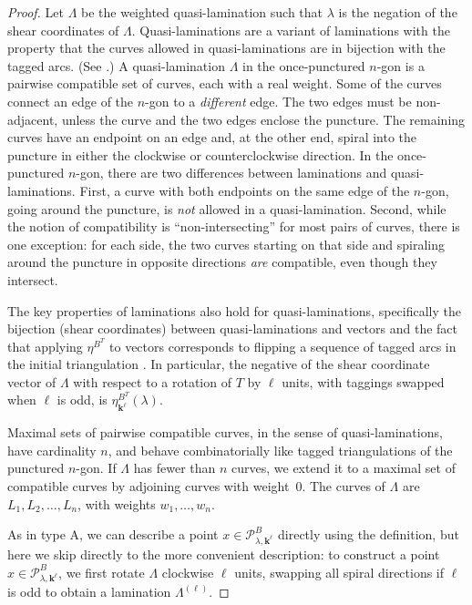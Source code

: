 \documentclass[10pt]{article}
\theoremstyle{definition}
\theoremstyle{remark}
\numberwithin{equation}{section}
\newcommand{\0}{{\mathbf{0}}}
\newcommand{\kk}{{\boldsymbol{k}}}
\renewcommand{\P}{\mathcal{P}}
\begin{document}
\begin{proof}
Let $\Lambda$ be the weighted quasi-lamination such that $\lambda$ is the negation of the shear coordinates of $\Lambda$.
Quasi-laminations are a variant of laminations with the property that the curves allowed in quasi-laminations are in bijection with the tagged arcs.
(See \cite[Section~4]{unisurface}.)
A quasi-lamination $\Lambda$ in the once-punctured $n$-gon is a pairwise compatible set of curves, each with a real weight.
Some of the curves connect an edge of the $n$-gon to a \emph{different} edge.
The two edges must be non-adjacent, unless the curve and the two edges enclose the puncture.
The remaining curves have an endpoint on an edge and, at the other end, spiral into the puncture in either the clockwise or counterclockwise direction.
In the once-punctured $n$-gon, there are two differences between laminations and quasi-laminations.
First, a curve with both endpoints on the same edge of the $n$-gon, going around the puncture, is \emph{not} allowed in a quasi-lamination.
Second, while the notion of compatibility is ``non-intersecting'' for most pairs of curves, there is one exception:  
for each side, the two curves starting on that side and spiraling around the puncture in opposite directions \emph{are} compatible, even though they intersect.

The key properties of laminations also hold for quasi-laminations, specifically the bijection (shear coordinates) between quasi-laminations and vectors \cite[Theorem~4.4]{unisurface} and the fact that applying $\eta^{B^T}$ to vectors corresponds to flipping a sequence of tagged arcs in the initial triangulation \cite[Theorem~4.3]{unisurface}.
In particular, the negative of the shear coordinate vector of $\Lambda$ with respect to a rotation of $T$ by $\ell$ units, with taggings swapped when $\ell$ is odd, is $\eta^{B^T}_{\kk^\ell}(\lambda)$.

Maximal sets of pairwise compatible curves, in the sense of quasi-laminations, have cardinality $n$, and behave combinatorially like tagged triangulations of the punctured $n$-gon.
If $\Lambda$ has fewer than $n$ curves, we extend it to a maximal set of compatible curves by adjoining curves with weight~$0$.
The curves of $\Lambda$ are $L_1,L_2,\ldots,L_n$, with weights $w_1,\ldots,w_n$.

As in type A, we can describe a point $x\in\P^B_{\lambda,\kk^\ell}$ directly using the definition,  %
but here we skip directly to the more convenient description:
to construct a point $x\in\P^B_{\lambda,\kk^\ell}$, we first rotate $\Lambda$ clockwise $\ell$ units, swapping all spiral directions if $\ell$ is odd to obtain a lamination $\Lambda^{(\ell)}$.


\end{proof}
\end{document}
